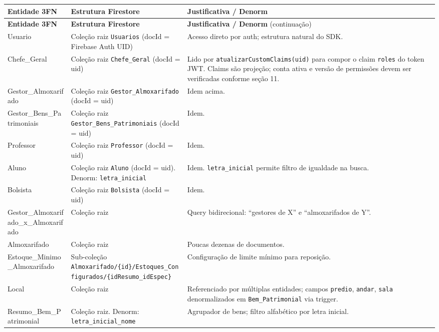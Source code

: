 \small
\setlength{\tabcolsep}{4.5pt}
\small
\setlength{\tabcolsep}{4pt}
\begin{longtable}{>{\raggedright\arraybackslash}p{} >{\raggedright\arraybackslash}p{} >{\raggedright\arraybackslash}p{}}
\toprule
\textbf{Entidade 3FN} & \textbf{Estrutura Firestore} & \textbf{Justificativa / Denorm}\\
\midrule
\endfirsthead
\toprule
\textbf{Entidade 3FN} & \textbf{Estrutura Firestore} & \textbf{Justificativa / Denorm} (continuação)\\
\midrule
\endhead
\bottomrule
\endfoot
Usuario & Coleção raiz \texttt{Usuarios} (docId = Firebase Auth UID) & Acesso direto por auth; estrutura natural do SDK.\\
Chefe\_Geral & Coleção raiz \texttt{Chefe\_Geral} (docId = uid) & Lido por \texttt{atualizarCustomClaims(uid)} para compor o claim \texttt{roles} do token JWT. Claims são projeção; conta ativa e versão de permissões devem ser verificadas conforme seção 11.\\
Gestor\_Almoxarifado & Coleção raiz \texttt{Gestor\_Almoxarifado} (docId = uid) & Idem acima.\\
Gestor\_Bens\_Patrimoniais & Coleção raiz \texttt{Gestor\_Bens\_Patrimoniais} (docId = uid) & Idem.\\
Professor & Coleção raiz \texttt{Professor} (docId = uid) & Idem.\\
Aluno & Coleção raiz \texttt{Aluno} (docId = uid). Denorm: \texttt{letra\_inicial} & Idem. \texttt{letra\_inicial} permite filtro de igualdade na busca.\\
Bolsista & Coleção raiz \texttt{Bolsista} (docId = uid) & Idem.\\
Gestor\_Almoxarifado\_x\_Almoxarifado & Coleção raiz & Query bidirecional: ``gestores de X'' e ``almoxarifados de Y''.\\
Almoxarifado & Coleção raiz & Poucas dezenas de documentos.\\
Estoque\_Minimo\_Almoxarifado & Sub-coleção \nolinkurl{Almoxarifado/\{id\}/Estoques\_Configurados/\{idResumo\_idEspec\}} & Configuração de limite mínimo para reposição.\\
Local & Coleção raiz & Referenciado por múltiplas entidades; campos \texttt{predio}, \texttt{andar}, \texttt{sala} denormalizados em \texttt{Bem\_Patrimonial} via trigger.\\
Resumo\_Bem\_Patrimonial & Coleção raiz. Denorm: \texttt{letra\_inicial\_nome} & Agrupador de bens; filtro alfabético por letra inicial.\\

\end{longtable}

